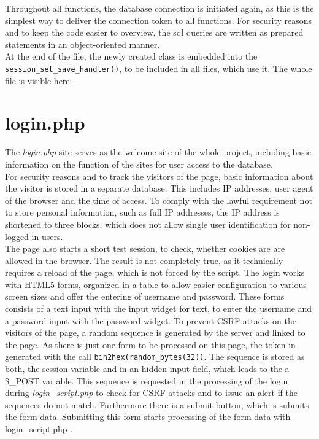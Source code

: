 Throughout all functions, the database connection is initiated again, as this is the simplest way to deliver the connection token to all functions. For security reasons and to keep the code easier to 
overview, the sql queries are written as prepared statements in an object-oriented manner.\\
At the end of the file, the newly created class is embedded into the \texttt{session\_set\_save\_handler()}, to be included in all files, which use it.
The whole file is visible here:


\section{login.php}
The \emph{login.php} site serves as the welcome site of the whole project, including basic information on the function of the sites for user access to the database.\\
For security reasons and to track the visitors of the page, basic information about the visitor is stored in a separate database. This includes IP addresses, user agent of 
the browser and the time of access. To comply with the lawful requirement not to store personal information, such as full IP addresses, the IP address is shortened to three blocks,
which does not allow single user identification for non-logged-in users.\\
The page also starts a short test session, to check, whether cookies are are allowed in the browser. The result is not completely true, as it technically requires a reload of the 
page, which is not forced by the script.
The login works with HTML5 forms, organized in a table to allow easier configuration to various screen sizes and offer the entering of username and password. 
These forms consists of a text input with the input widget for text, to enter the username and a password input with the 
password widget. To prevent CSRF-attacks on the visitors of the page, a random sequence is generated by the server and linked to the page. As there is just one form to be processed on this page, the 
token in generated with the call \texttt{bin2hex(random\_bytes(32))}. The sequence is stored as both, the session variable and in an hidden input field, which leads to the a \$\_POST variable. 
This sequence is requested in the processing of the login during \emph{login\_script.php} to check for CSRF-attacks and to issue an alert if the sequences do not match. 
Furthermore there is a submit button, which is submits the form data. Submitting this form starts processing of the form data with login\_script.php .

